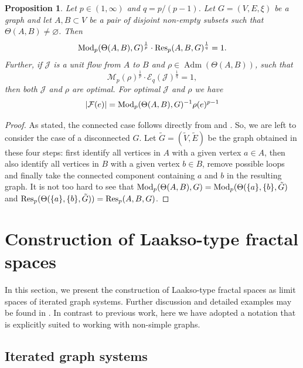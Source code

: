 \documentclass{amsart}
\newcommand{\Mod}{{\rm Mod}}
\newcommand{\Res}{{\rm Res}}
\newcommand{\Adm}{\operatorname{Adm}}
\newtheorem{proposition}[equation]{Proposition}
\numberwithin{equation}{section}
\theoremstyle{definition}
\theoremstyle{remark}
\newcommand{\cJ}{\mathcal{J}}
\begin{document}
\begin{proposition}\label{Proposition: Duality}
    Let $p\in (1,\infty)$ and $q = p/(p-1)$. Let \(G=(V,E,\xi)\) be a graph and let \(A,B\subset V\) be a pair of disjoint non-empty subsets such that $\Theta(A,B) \neq \varnothing$.
    Then
        \[
            \Mod_p(\Theta(A,B),G)^{\frac{1}{p}}\cdot\Res_p(A,B,G)^{\frac{1}{q}}=1.
        \]
    Further, if \(\cJ\) is a unit flow from \(A\) to \(B\) and \(\rho\in \Adm(\Theta(A,B))\), such that
        \[
            \mathcal{M}_p(\rho)^{\frac{1}{p}}\cdot\mathcal{E}_q(\mathcal{\cJ})^{\frac{1}{q}}=1,
        \]
    then both $\cJ$ and $\rho$ are optimal. For optimal $\cJ$ and $\rho$ we have
        \begin{equation}\label{flow_mod_vanish}
            \lvert \mathcal{F}(e) \rvert = \Mod_p(\Theta(A,B),G)^{-1}\rho(e)^{p-1}
        \end{equation}
\end{proposition}
\begin{proof} 
As stated, the connected case follows directly from \cite[Theorem 5.1]{NakamuraYamasakiDuality} and \cite[Lemma 4.13]{anttila2024constructions}. So, we are left to consider the case of a disconnected $G$. Let $\tilde{G}=(\tilde{V}, \tilde{E})$ be the graph obtained in these four steps: first identify all vertices in $A$ with a given vertex $a\in A$, then also identify all vertices in $B$ with a given vertex $b\in B$, remove possible loops and finally take the connected component containing $a$ and $b$ in the resulting graph.  It is not too hard to see that $\Mod_p(\Theta(A,B),G)=\Mod_p(\Theta(\{a\}, \{b\}, \tilde{G})$ and $\Res_p(\Theta(\{a\}, \{b\}, \tilde{G}))=\Res_p(A,B,G)$. 
\end{proof}



\section{Construction of Laakso-type fractal spaces}\label{Section: Construction of Laakso-type fractal spaces}

In this section, we present the construction of Laakso-type fractal spaces as limit spaces of iterated graph systems. Further discussion and detailed examples may be found in \cite{anttila2024constructions,ASEBShimizu}. In contrast to previous work, here we have adopted a notation that is explicitly suited to working with non-simple graphs.

\subsection{Iterated graph systems}\label{Subsection: Iterated graph systems} 
\end{document}
